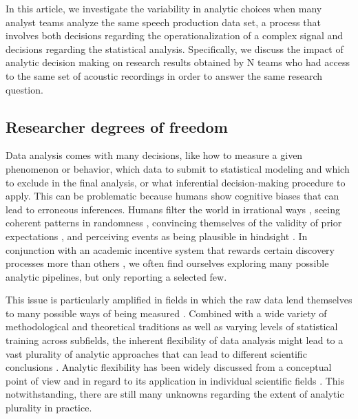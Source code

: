 \documentclass[Review,times,sageh]{sagej}
\begin{document}
In this article, we investigate the variability in analytic choices when many analyst teams analyze the same speech production data set, a process that involves both decisions regarding the operationalization of a complex signal and decisions regarding the statistical analysis.
Specifically, we discuss the impact of analytic decision making on research results obtained by N teams who had access to the same set of acoustic recordings in order to answer the same research question.

\hypertarget{researcher-degrees-of-freedom}{%
\subsection{Researcher degrees of freedom}\label{researcher-degrees-of-freedom}}

Data analysis comes with many decisions, like how to measure a given phenomenon or behavior, which data to submit to statistical modeling and which to exclude in the final analysis, or what inferential decision-making procedure to apply.
This can be problematic because humans show cognitive biases that can lead to erroneous inferences.
Humans filter the world in irrational ways \citep[e.g.,][]{tversky1974judgment}, seeing coherent patterns in randomness \citep{brugger2001}, convincing themselves of the validity of prior expectations \citep[``I knew it'',][]{nickerson1998confirmation}, and perceiving events as being plausible in hindsight \citep[``I knew it all along'',][]{fischhoff1975hindsight}.
In conjunction with an academic incentive system that rewards certain discovery processes more than others \citep{sterling1959publication, koole2012rewarding}, we often find ourselves exploring many possible analytic pipelines, but only reporting a selected few.

This issue is particularly amplified in fields in which the raw data lend themselves to many possible ways of being measured \citep{roettger2019researcher}.
Combined with a wide variety of methodological and theoretical traditions as well as varying levels of statistical training across subfields, the inherent flexibility of data analysis might lead to a vast plurality of analytic approaches that can lead to different scientific conclusions \citep{roettger2019emergent}.
Analytic flexibility has been widely discussed from a conceptual point of view \citep{simmons2011false, wagenmakers2012agenda, nosek2014method} and in regard to its application in individual scientific fields \citep[e.g.~][]{wicherts2016, charles2019, roettger2019researcher}.
This notwithstanding, there are still many unknowns regarding the extent of analytic plurality in practice.
\end{document}
